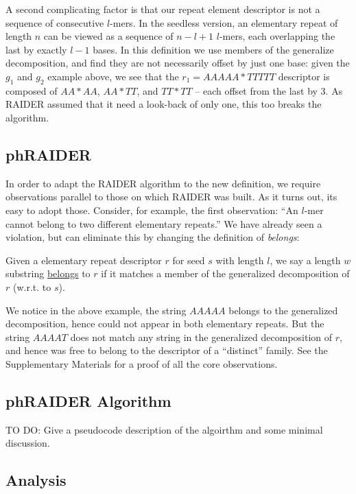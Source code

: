 \documentclass{bmcart}
\newcommand{\red}[1]{{\color{red}#1}}
\begin{document}
A second complicating factor is that our repeat element descriptor is
not a sequence of consecutive $l$-mers. In the seedless version, an
elementary repeat of length $n$ can be viewed as a sequence of $n-l+1$
$l$-mers, each overlapping the last by exactly $l-1$ bases. In this
definition we use members of the generalize decomposition, and find
they are not necessarily offset by just one base: given the $g_1$ and
$g_2$ example above, we see that the $r_1 = AAAAA*TTTTT$ descriptor is
composed of $AA*AA$, $AA*TT$, and $TT*TT$ -- each offset from the last
by 3.  As RAIDER assumed that it need a look-back of only one, this
too breaks the algorithm.

\subsection*{phRAIDER}

In order to adapt the RAIDER algorithm to the new definition, we
require observations parallel to those on which RAIDER was built.  As
it turns out, its easy to adopt those.  Consider, for example, the
first observation: ``An $l$-mer cannot belong to two different
elementary repeats.''  We have already seen a violation, but can
eliminate this by changing the definition of {\it belongs}:
\begin{definition}
  Given a elementary repeat descriptor $r$ for seed $s$ with length
  $l$, we say a length $w$ substring \underline{belongs} to $r$ if it
  matches a member of the generalized decomposition of $r$ (w.r.t. to
  $s$).
\end{definition}
We notice in the above example, the string $AAAAA$ belongs to the
generalized decomposition, hence could not appear in both elementary
repeats.  But the string $AAAAT$ does not match any string in the
generalized decomposition of $r$, and hence was free to belong to the
descriptor of a ``distinct'' family.  See the Supplementary Materials
for a proof of all the core observations.

\subsection*{phRAIDER Algorithm}

\red{
TO DO: Give a pseudocode description of the algoirthm and some minimal
discussion.
}

\subsection*{Analysis}
\end{document}
